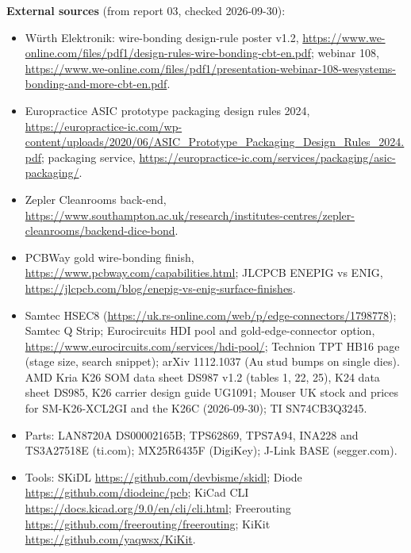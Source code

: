 \documentclass[10pt,a4paper]{article}
\begin{document}
\textbf{External sources} (from report 03, checked 2026-09-30):
\begin{itemize}\raggedright
\item Würth Elektronik: wire-bonding design-rule poster v1.2, \url{https://www.we-online.com/files/pdf1/design-rules-wire-bonding-cbt-en.pdf}; webinar 108, \url{https://www.we-online.com/files/pdf1/presentation-webinar-108-wesystems-bonding-and-more-cbt-en.pdf}.
\item Europractice ASIC prototype packaging design rules 2024, \url{https://europractice-ic.com/wp-content/uploads/2020/06/ASIC_Prototype_Packaging_Design_Rules_2024.pdf}; packaging service, \url{https://europractice-ic.com/services/packaging/asic-packaging/}.
\item Zepler Cleanrooms back-end, \url{https://www.southampton.ac.uk/research/institutes-centres/zepler-cleanrooms/backend-dice-bond}.
\item PCBWay gold wire-bonding finish, \url{https://www.pcbway.com/capabilities.html}; JLCPCB ENEPIG vs ENIG, \url{https://jlcpcb.com/blog/enepig-vs-enig-surface-finishes}.
\item Samtec HSEC8 (\url{https://uk.rs-online.com/web/p/edge-connectors/1798778}); Samtec Q Strip; Eurocircuits HDI pool and gold-edge-connector option, \url{https://www.eurocircuits.com/services/hdi-pool/}; Technion TPT HB16 page (stage size, search snippet); arXiv 1112.1037 (Au stud bumps on single dies). AMD Kria K26 SOM data sheet DS987 v1.2 (tables 1, 22, 25), K24 data sheet DS985, K26 carrier design guide UG1091; Mouser UK stock and prices for SM-K26-XCL2GI and the K26C (2026-09-30); TI SN74CB3Q3245.
\item Parts: LAN8720A DS00002165B; TPS62869, TPS7A94, INA228 and TS3A27518E (ti.com); MX25R6435F (DigiKey); J-Link BASE (segger.com).
\item Tools: SKiDL \url{https://github.com/devbisme/skidl}; Diode \url{https://github.com/diodeinc/pcb}; KiCad CLI \url{https://docs.kicad.org/9.0/en/cli/cli.html}; Freerouting \url{https://github.com/freerouting/freerouting}; KiKit \url{https://github.com/yaqwsx/KiKit}.
\end{itemize}
\end{document}

